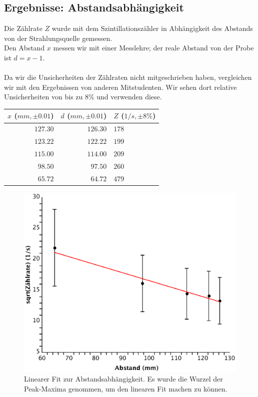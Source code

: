 \documentclass{article}
\begin{document}
\subsection{Ergebnisse: Abstandsabhängigkeit}
Die Zählrate $Z$ wurde mit dem Szintillationszähler in Abhängigkeit des Abstands von der Strahlungsquelle gemessen.\\
Den Abstand $x$ messen wir mit einer Messlehre; der reale Abstand von der Probe ist $d=x-1$.\\
\\
Da wir die Unsicherheiten der Zählraten nicht mitgeschrieben haben, vergleichen wir mit den Ergebnissen von anderen Mitstudenten. Wir sehen dort relative Unsicherheiten von bis zu $8\%$ und verwenden diese.
\\
\begin{center}
\begin{tabular}{|r|r||l|}
\hline
$x$ ($\si{mm}, \pm 0.01$) & $d$ ($\si{mm}, \pm 0.01$) & $Z$ ($1/s, \pm 8\% $)\\
\hline
$127.30$ & $126.30$ & $178$\\
$123.22$ & $122.22$ & $199$\\
$115.00$ & $114.00$ & $209$\\
$98.50$ & $97.50$ & $260$\\
$65.72$ & $64.72$ & $479$\\
\hline
\end{tabular}
\end{center}

\begin{center}
\begin{figure}[H]
\includegraphics[scale=0.6]{abstandwurzel.eps}
\caption{Linearer Fit zur Abstandsabhängigkeit. Es wurde die Wurzel der Peak-Maxima genommen, um den linearen Fit machen zu können.}
\end{figure}
\end{center}
\end{document}
